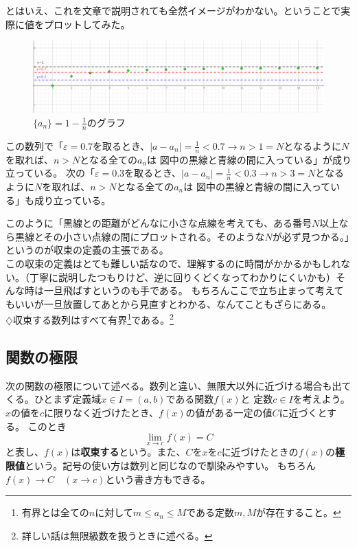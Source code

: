 \documentclass[a4j,dvipdfmx]{jsarticle}
\begin{document}
                とはいえ、これを文章で説明されても全然イメージがわかない。ということで実際に値をプロットしてみた。
                \begin{figure}[h]
                    \centering
                    \includegraphics[keepaspectratio,scale=0.45]{img/QuuNote/SequeanceLimitGraph.png}
                    \caption{$\{a_n\}=1-\frac{1}{n}$のグラフ}
                \end{figure}
                
                この数列で「$\varepsilon=0.7$を取るとき、$|a-a_n|=\frac{1}{n}<0.7\to n> 1=N$となるように$N$を取れば、$n>N$となる全ての$a_n$は
                図中の黒線と青線の間に入っている」が成り立っている。
                次の「$\varepsilon=0.3$を取るとき、$|a-a_n|=\frac{1}{n}<0.3\to n>3=N$となるように$N$を取れば、$n>N$となる全ての$a_n$は
                図中の黒線と青線の間に入っている」も成り立っている。

                このように「黒線との距離がどんなに小さな点線を考えても、ある番号$N$以上なら黒線とその小さい点線の間にプロットされる。そのような$N$が必ず見つかる。」というのが収束の定義の主張である。\\

                この収束の定義はとても難しい話なので、理解するのに時間がかかるかもしれない。（丁寧に説明したつもりけど、逆に回りくどくなってわかりにくいかも）そんな時は一旦飛ばすというのも手である。
                もちろんここで立ち止まって考えてもいいが一旦放置してあとから見直すとわかる、なんてこともざらにある。\\

                {\color{blue}$\diamondsuit$収束する数列はすべて有界\footnote{有界とは全ての$n$に対して$m\leq a_n \leq M$である定数$m,M$が存在すること。}である。\footnote{詳しい話は無限級数を扱うときに述べる。}}
            \clearpage
            \subsection{関数の極限}
                次の関数の極限について述べる。数列と違い、無限大以外に近づける場合も出てくる。ひとまず定義域$x\in I=(a,b)$である関数$f(x)$と
                定数$c\in I$を考えよう。$x$の値を$c$に限りなく近づけたとき、$f(x)$の値がある一定の値$C$に近づくとする。
                このとき
                \begin{equation}
                    \lim_{x\to c}f(x)=C
                \end{equation}
                と表し、$f(x)$は\textbf{収束する}という。また、$C$を$x$を$c$に近づけたときの$f(x)$の\textbf{極限値}という。記号の使い方は数列と同じなので馴染みやすい。
                もちろん$f(x)\to C\quad(x\to c)$という書き方もできる。
                
\end{document}

